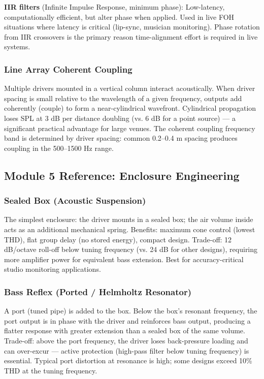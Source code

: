 \documentclass[11pt,letterpaper]{article}
\begin{document}
\textbf{IIR filters} (Infinite Impulse Response, minimum phase): Low-latency, computationally efficient, but alter phase when applied. Used in live FOH situations where latency is critical (lip-sync, musician monitoring). Phase rotation from IIR crossovers is the primary reason time-alignment effort is required in live systems.

\subsubsection{Line Array Coherent Coupling}

Multiple drivers mounted in a vertical column interact acoustically. When driver spacing is small relative to the wavelength of a given frequency, outputs add coherently (couple) to form a near-cylindrical wavefront. Cylindrical propagation loses SPL at 3 dB per distance doubling (vs. 6 dB for a point source) --- a significant practical advantage for large venues. The coherent coupling frequency band is determined by driver spacing: common 0.2--0.4 m spacing produces coupling in the 500--1500 Hz range.

\subsection{Module 5 Reference: Enclosure Engineering}

\subsubsection{Sealed Box (Acoustic Suspension)}

The simplest enclosure: the driver mounts in a sealed box; the air volume inside acts as an additional mechanical spring. Benefits: maximum cone control (lowest THD), flat group delay (no stored energy), compact design. Trade-off: 12 dB/octave roll-off below tuning frequency (vs. 24 dB for other designs), requiring more amplifier power for equivalent bass extension. Best for accuracy-critical studio monitoring applications.

\subsubsection{Bass Reflex (Ported / Helmholtz Resonator)}

A port (tuned pipe) is added to the box. Below the box's resonant frequency, the port output is in phase with the driver and reinforces bass output, producing a flatter response with greater extension than a sealed box of the same volume. Trade-off: above the port frequency, the driver loses back-pressure loading and can over-excur --- active protection (high-pass filter below tuning frequency) is essential. Typical port distortion at resonance is high; some designs exceed 10\% THD at the tuning frequency.
\end{document}
